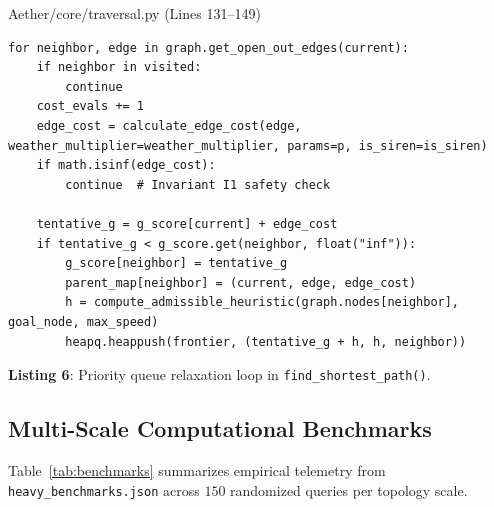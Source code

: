 \documentclass[10pt,a4paper]{article}
\begin{document}
\begin{codebox}{Aether/core/traversal.py (Lines 131--149)}
\begin{lstlisting}[style=AetherPython]
for neighbor, edge in graph.get_open_out_edges(current):
    if neighbor in visited:
        continue
    cost_evals += 1
    edge_cost = calculate_edge_cost(edge, weather_multiplier=weather_multiplier, params=p, is_siren=is_siren)
    if math.isinf(edge_cost):
        continue  # Invariant I1 safety check

    tentative_g = g_score[current] + edge_cost
    if tentative_g < g_score.get(neighbor, float("inf")):
        g_score[neighbor] = tentative_g
        parent_map[neighbor] = (current, edge, edge_cost)
        h = compute_admissible_heuristic(graph.nodes[neighbor], goal_node, max_speed)
        heapq.heappush(frontier, (tentative_g + h, h, neighbor))
\end{lstlisting}
\end{codebox}
\vspace{-3pt}
\begin{center}\sffamily\footnotesize\textbf{Listing 6}: Priority queue relaxation loop in \texttt{find\_shortest\_path()}.\end{center}

\subsection{Multi-Scale Computational Benchmarks}
Table~\ref{tab:benchmarks} summarizes empirical telemetry from \texttt{heavy\_benchmarks.json} across $150$ randomized queries per topology scale.
\end{document}
